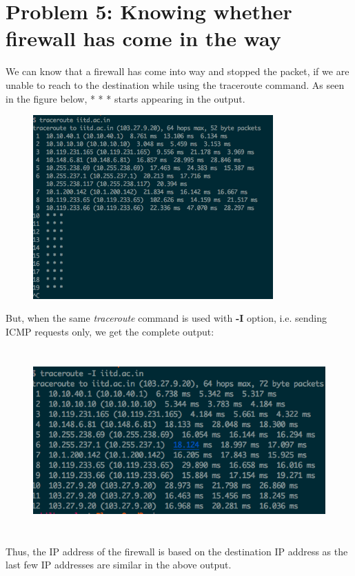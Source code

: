 \documentclass[]{report}
\begin{document}
\section{Problem 5: Knowing whether firewall has come in the way}
We can know that a firewall has come into way and stopped the packet, if we are unable to reach to the destination while using the traceroute command. As seen in the figure below, * * * starts appearing in the output.
\begin{figure}[H]
	\vspace{0pt}
	\includegraphics[height = 200pt, keepaspectratio]{Snapshots/exe5/q5_1.png}
\end{figure}

But, when the same \textit{traceroute} command is used with \textbf{-I} option, i.e. sending ICMP requests only, we get the complete output: 
\begin{figure}[H]
	\vspace{0pt}
	\includegraphics[height = 200pt, keepaspectratio]{Snapshots/exe5/q5_2.png}
\end{figure}
Thus, the IP address of the firewall is based on the destination IP address as the last few IP addresses are similar in the above output.
\end{document}
